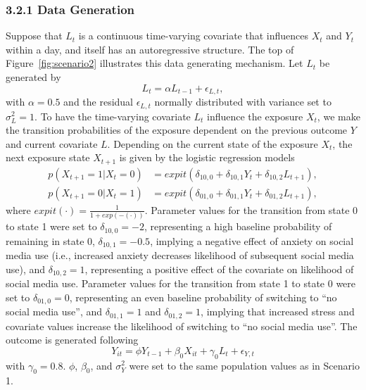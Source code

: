 \documentclass[man]{apa7} %
\begin{document}
\subsubsection{3.2.1 Data Generation}
Suppose that $L_{t}$ is a continuous time-varying covariate that influences $X_{t}$ and $Y_{t}$ within a day, and itself has an autoregressive structure. The top of Figure~\ref{fig:scenario2} illustrates this data generating mechanism. Let $L_{t}$ be generated by
\begin{equation*} \label{eq:scenario2-DGM-L}
    L_{t} = \alpha L_{t - 1} + \epsilon_{L,t},
\end{equation*}
with $\alpha = 0.5$ and the residual $\epsilon_{L, t}$ normally distributed with variance set to $\sigma_{L}^{2} = 1$. To have the time-varying covariate $L_{t}$ influence the exposure $X_{t}$, we make the transition probabilities of the exposure dependent on the previous outcome $Y$ and current covariate $L$. Depending on the current state of the exposure $X_{t}$, the next exposure state $X_{t + 1}$ is given by the logistic regression models 
\begin{align*} 
    p(X_{t + 1} = 1 | X_{t} = 0) &= expit(\delta_{10, 0} + \delta_{10, 1} Y_{t} + \delta_{10, 2} L_{t + 1}), \\ 
    p(X_{t + 1} = 0 | X_{t} = 1) &= expit(\delta_{01, 0} + \delta_{01, 1} Y_{t} + \delta_{01, 2} L_{t + 1}),
\end{align*}
where $expit(\cdot) = \frac{1}{1 + exp(-(\cdot))}$. Parameter values for the transition from state 0 to state 1 were set to $\delta_{10, 0} = -2$, representing a high baseline probability of remaining in state 0, $\delta_{10, 1} = -0.5$, implying a negative effect of anxiety on social media use (i.e., increased anxiety decreases likelihood of subsequent social media use), and $\delta_{10, 2} = 1$, representing a positive effect of the covariate on likelihood of social media use. Parameter values for the transition from state 1 to state 0 were set to $\delta_{01, 0} = 0$, representing an even baseline probability of switching to ``no social media use'', and $\delta_{01, 1} = 1$ and $\delta_{01, 2} = 1$, implying that increased stress and covariate values increase the likelihood of switching to ``no social media use''. The outcome is generated following
\begin{equation} \label{eq:scenario2-DGM-Y}
    Y_{it} = \phi Y_{t - 1} + \beta_{0} X_{it} + \gamma_{0} L_{t} + \epsilon_{Y,t}
\end{equation}
with $\gamma_{0} = 0.8$. $\phi$, $\beta_{0}$, and $\sigma_{Y}^{2}$ were set to the same population values as in Scenario 1. 
\end{document}
